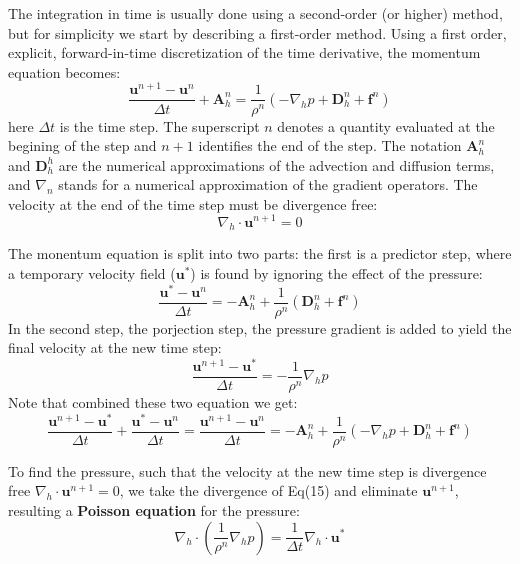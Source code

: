 \documentclass[11pt]{article} %
\begin{document}
The integration in time is usually done using a second-order (or higher) method, but for simplicity we start by describing a first-order method. Using a first order, explicit, forward-in-time discretization of the time derivative, the momentum equation becomes:
\begin{equation}
\frac{\textbf{u}^{n+1}-\textbf{u}^{n}}{\Delta t} + \textbf{A}_{h}^{n} = \frac{1}{\rho^{n}}(-\nabla_{h}p + \textbf{D}_{h}^{n}+ \textbf{f}^{n})
\end{equation} 
here $\Delta t$ is the time step. The superscript $n$ denotes a quantity evaluated at the begining of the step and $n+1$ identifies the end of the step. The notation $\textbf{A}_{h}^{n} $ and $\textbf{D}_{h}^{h} $ are the numerical approximations of the advection and diffusion terms, and $\nabla_{n}$ stands for a numerical approximation of the gradient operators. The velocity at the end of the time step must be divergence free:
\begin{equation}
\nabla_{h}\cdot \textbf{u}^{n+1} = 0
\end{equation}\par 
The monentum equation is split into two parts: the first is a predictor step, where a temporary velocity field ($\textbf{u}^{*}$) is found by ignoring the effect of the pressure:
\begin{equation}
\frac{\textbf{u}^{*}-\textbf{u}^{n}}{\Delta t} = -\textbf{A}_{h}^{n}+\frac{1}{\rho^{n}}( \textbf{D}_{h}^{n}+ \textbf{f}^{n})
\end{equation}
In the second step, the porjection step, the pressure gradient is added to yield the final velocity at the new time step:
\begin{equation}
\frac{\textbf{u}^{n+1}-\textbf{u}^{*}}{\Delta t}  = -\frac{1}{\rho^{n}}\nabla_{h}p 
\end{equation}
Note that combined these two equation we get:
$$
\frac{\textbf{u}^{n+1}-\textbf{u}^{*}}{\Delta t} +\frac{\textbf{u}^{*}-\textbf{u}^{n}}{\Delta t} =\frac{\textbf{u}^{n+1}-\textbf{u}^{n}}{\Delta t} =- \textbf{A}_{h}^{n}+ \frac{1}{\rho^{n}}(-\nabla_{h}p + \textbf{D}_{h}^{n}+ \textbf{f}^{n})
$$\par
To find the pressure, such that the velocity at the new time step is divergence free $\nabla_{h}\cdot \textbf{u}^{n+1} = 0$, we take the divergence of Eq(15) and eliminate $\textbf{u}^{n+1}$, resulting a \textbf{Poisson equation} for the pressure:
\begin{equation}
\nabla_{h}\cdot \left(\frac{1}{\rho^{n}}\nabla_{h}p  \right) = \frac{1}{\Delta t}\nabla_{h} \cdot \textbf{u}^{*}
\end{equation}\par
\end{document}
